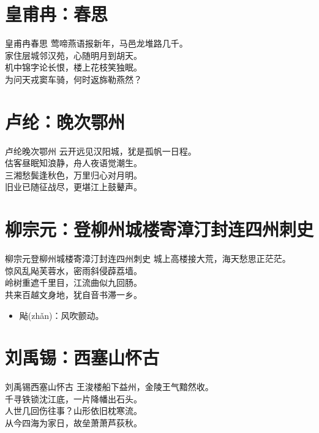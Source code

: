 \documentclass[12pt,oneside,a5paper]{book}
\begin{document}
\chapter{皇甫冉：春思}
\begin{poemzh}{皇甫冉}{春思}
莺啼燕语报新年，马邑龙堆路几千。\\
家住层城邻汉苑，心随明月到胡天。\\
机中锦字论长恨，楼上花枝笑独眠。\\
为问天戎窦车骑，何时返旆勒燕然？\\ 
\end{poemzh}

\chapter{卢纶：晚次鄂州}
\begin{poemzh}{卢纶}{晚次鄂州}
云开远见汉阳城，犹是孤帆一日程。\\
估客昼眠知浪静，舟人夜语觉潮生。\\
三湘愁鬓逢秋色，万里归心对月明。\\
旧业已随征战尽，更堪江上鼓鼙声。\\ 
\end{poemzh}

\chapter{柳宗元：登柳州城楼寄漳汀封连四州刺史}
\begin{poemzh}{柳宗元}{登柳州城楼寄漳汀封连四州刺史}
城上高楼接大荒，海天愁思正茫茫。\\
惊风乱飐芙蓉水，密雨斜侵薜荔墙。\\
岭树重遮千里目，江流曲似九回肠。\\
共来百越文身地，犹自音书滞一乡。\\ 
\end{poemzh}

\begin{itemize}
\item 飐(zhǎn)：风吹颤动。
\end{itemize}

\chapter{刘禹锡：西塞山怀古}
\begin{poemzh}{刘禹锡}{西塞山怀古}
王浚楼船下益州，金陵王气黯然收。\\
千寻铁锁沈江底，一片降幡出石头。\\
人世几回伤往事？山形依旧枕寒流。\\
从今四海为家日，故垒萧萧芦荻秋。\\ 
\end{poemzh}
\end{document}
